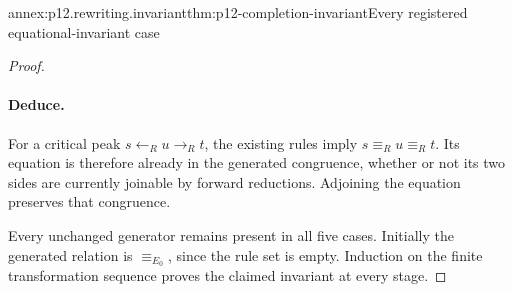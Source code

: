 \begin{annexitem}{annex:p12.rewriting.invariant}{thm:p12-completion-invariant}{Every registered equational-invariant case}
\begin{proof}
\paragraph{Deduce.}
For a critical peak \(s\leftarrow_R u\to_R t\), the existing
rules imply \(s\equiv_R u\equiv_R t\). Its equation is therefore
already in the generated congruence, whether or not its two sides
are currently joinable by forward reductions. Adjoining the equation
preserves that congruence.

Every unchanged generator remains present in all five cases. Initially
the generated relation is \(\equiv_{E_0}\), since the rule set is
empty. Induction on the finite transformation sequence proves the
claimed invariant at every stage.
\end{proof}
\end{annexitem}

